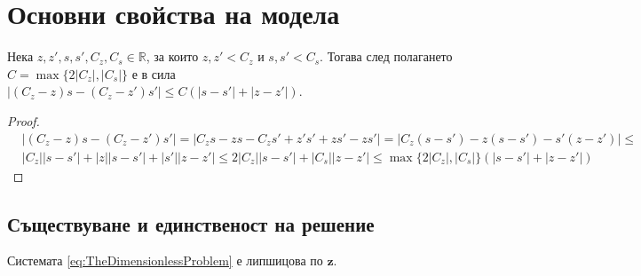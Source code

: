 \section{Основни свойства на модела}
\begin{lemma}
  \label{lemma:Modulus}
  Нека $z, z', s, s', C_z, C_s \in \mathbb{R}$, за които $z, z' < C_z$ и $s, s' < C_s$. Тогава след полагането $C = \max\{2 |C_z|, |C_s|\}$ е в сила $|(C_z - z) s - (C_z - z') s'| \leq C (|s-s'| + |z - z'|)$.
\end{lemma}

\begin{proof}
  \begin{equation}
    \begin{split}
      &|(C_z - z) s - (C_z - z') s'| =
      |C_z s - z s - C_z s' + z' s' + z s' - z s'| =
      |C_z (s - s') - z (s - s') - s' (z - z')| \leq \\
      &|C_z| |s - s'| + |z| |s - s'| + |s'| |z - z'| \leq
      2 |C_z| |s - s'|  + |C_s| |z - z'| \leq
      \max\{2 |C_z|, |C_s|\} (|s-s'| + |z - z'|)
    \end{split}
    \end{equation}
    \end{proof}
\subsection{Съществуване и единственост на решение}
\begin{proposition}
  \label{prp:LipschitzContinuity}
  Системата \eqref{eq:TheDimensionlessProblem} е липшицова по $\mathbf{z}$.
\end{proposition}

